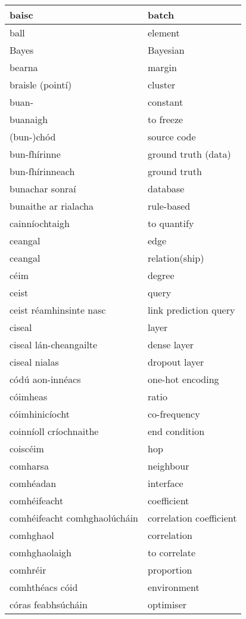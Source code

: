 \documentclass{article}
\begin{document}
\begin{longtable}{|l|l|}
		baisc&batch\\ \hline 
		ball&element\\ \hline 
		Bayes&Bayesian\\ \hline 
		bearna&margin\\ \hline 
		braisle (pointí)&cluster\\ \hline 
		buan-&constant\\ \hline 
		buanaigh&to freeze\\ \hline 
		(bun-)chód&source code\\ \hline 
		bun-fhírinne&ground truth (data)\\ \hline 
		bun-fhírinneach&ground truth\\ \hline 
		bunachar sonraí&database\\ \hline 
		bunaithe ar rialacha&rule-based\\ \hline 
		cainníochtaigh&to quantify\\ \hline 
		ceangal&edge\\ \hline 
		ceangal&relation(ship)\\ \hline 
		céim&degree\\ \hline 
		ceist&query\\ \hline 
		ceist réamhinsinte nasc&link prediction query\\ \hline 
		ciseal&layer\\ \hline 
		ciseal lán-cheangailte&dense layer\\ \hline 
		ciseal nialas&dropout layer\\ \hline 
		códú aon-innéacs&one-hot encoding\\ \hline 
		cóimheas&ratio\\ \hline 
		cóimhinicíocht&co-frequency\\ \hline 
		coinníoll críochnaithe&end condition\\ \hline 
		coiscéim&hop\\ \hline 
		comharsa&neighbour\\ \hline 
		comhéadan&interface\\ \hline 
		comhéifeacht&coefficient\\ \hline 
		comhéifeacht comhghaolúcháin&correlation coefficient\\ \hline 
		comhghaol&correlation\\ \hline 
		comhghaolaigh&to correlate\\ \hline 
		comhréir&proportion\\ \hline 
		comhthéacs cóid&environment\\ \hline 
		córas feabhsúcháin&optimiser\\ \hline 

\end{longtable}
\end{document}
